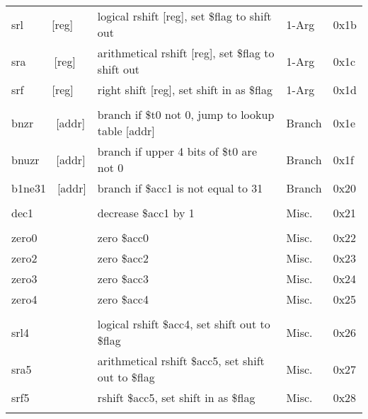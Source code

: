 \documentclass{article}
\begin{document}
\begin{longtable}[c]{L{2.6cm}|L{9.5cm}|C{1.2cm}|C{1.2cm}}
      srl\ \ \ \ \ [reg] & logical rshift [reg], set \$flag to shift out      & 1-Arg     & 0x1b \\
      sra\ \ \ \ \ [reg] & arithmetical rshift [reg], set \$flag to shift out & 1-Arg     & 0x1c \\
      srf\ \ \ \ \ [reg] & right shift [reg], set shift in as \$flag          & 1-Arg     & 0x1d \\
                         &                                                    &           &      \\
      \hline
      bnzr\ \ \ \ [addr] & branch if \$t0 not 0, jump to lookup table [addr]  & Branch    & 0x1e \\
      bnuzr\ \ \ [addr]  & branch if upper 4 bits of \$t0 are not 0           & Branch    & 0x1f \\
      b1ne31\ \ [addr]   & branch if \$acc1 is not equal to 31                & Branch    & 0x20 \\
                         &                                                    &           &      \\
      \hline
      dec1               & decrease \$acc1 by 1                               & Misc.     & 0x21 \\
                         &                                                    &           &      \\
      zero0              & zero \$acc0                                        & Misc.     & 0x22 \\
      zero2              & zero \$acc2                                        & Misc.     & 0x23 \\
      zero3              & zero \$acc3                                        & Misc.     & 0x24 \\
      zero4              & zero \$acc4                                        & Misc.     & 0x25 \\
                         &                                                    &           &      \\
      srl4               & logical rshift \$acc4, set shift out to \$flag     & Misc.     & 0x26 \\
      sra5               & arithmetical rshift \$acc5, set shift out to \$flag & Misc.    & 0x27 \\
      srf5               & rshift \$acc5, set shift in as \$flag              & Misc.     & 0x28 \\
                         &                                                    &           &      \\

\end{longtable}
\end{document}
